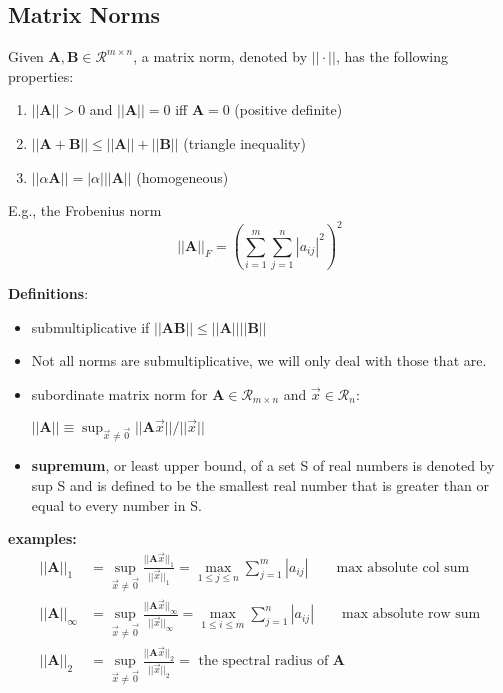 \documentclass[12pt]{article}
\newcommand{\ve}[1]{\ensuremath{\mathbf{#1}}}
\begin{document}
\subsection{Matrix Norms}
Given $\ve{A}, \ve{B} \in \mathcal{R}^{m \times n}$, a matrix norm, denoted by $|| \cdot ||$, has the following properties:
%
\begin{enumerate}
\item $||\ve{A}|| > 0$ and $||\ve{A}|| = 0$ iff $\ve{A} = 0$ (positive definite)
\item $||\ve{A} + \ve{B}|| \leq ||\ve{A}|| + ||\ve{B}||$ (triangle inequality)
\item $||\alpha \ve{A}|| = |\alpha| ||\ve{A}||$ (homogeneous)
\end{enumerate}

E.g., the Frobenius norm 
%
\begin{equation}
||\ve{A}||_F = ( \sum_{i=1}^m \sum_{j=1}^n |a_{ij}|^2 )^2 \nonumber
\end{equation}

\textbf{Definitions}:
\begin{itemize}
\item submultiplicative if $||\ve{A} \ve{B}|| \leq ||\ve{A}|| ||\ve{B}||$

\item Not all norms are submultiplicative, we will only deal with those that are. 

\item subordinate matrix norm for $\ve{A} \in \mathcal{R}_{m \times n}$ and $\vec{x} \in \mathcal{R}_n$:

$||\ve{A}|| \equiv \displaystyle \sup_{\vec{x} \neq \vec{0}} ||\ve{A}\vec{x}|| / ||\vec{x}||$

\item \textbf{supremum}, or least upper bound, of a set S of real numbers is denoted by sup S and is defined to be the smallest real number that is greater than or equal to every number in S.
\end{itemize}

\textbf{examples:}
%
\begin{align}
||\ve{A}||_{1} &= \displaystyle \sup_{\vec{x} \neq \vec{0}} \frac{||\ve{A}\vec{x}||_{1}}{||\vec{x}||_{1}} =
\displaystyle \max_{1 \leq j \leq n} \sum_{j=1}^m |a_{ij}| \qquad \text{max absolute col sum} \nonumber \\
%
||\ve{A}||_{\infty} &= \displaystyle \sup_{\vec{x} \neq \vec{0}} \frac{||\ve{A}\vec{x}||_{\infty}}{||\vec{x}||_{\infty}} = 
\displaystyle \max_{1 \leq i \leq m} \sum_{j=1}^n |a_{ij}| \qquad \text{max absolute row sum}\nonumber \\
%
||\ve{A}||_{2} &= \displaystyle \sup_{\vec{x} \neq \vec{0}} \frac{||\ve{A}\vec{x}||_{2}}{||\vec{x}||_{2}} = \text{ the spectral radius of }\ve{A} \nonumber 
\end{align}
\end{document}
